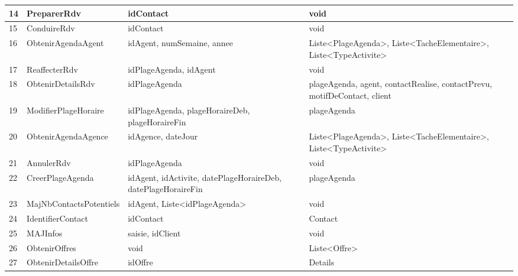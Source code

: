 \begin{table}[H]
{\begin{tabular}{p{1cm}|p{5cm}p{6cm}p{6cm}}
            14 & PreparerRdv                        & idContact                                                     & void\\ \hline
            15 & ConduireRdv                        & idContact                                                     & void\\ \hline
            16 & ObtenirAgendaAgent                 & idAgent, numSemaine, annee                                    & Liste<PlageAgenda>, Liste<TacheElementaire>, Liste<TypeActivite> \\ \hline
            17 & ReaffecterRdv                      & idPlageAgenda, idAgent                                        & void\\ \hline
            18 & ObtenirDetailsRdv                  & idPlageAgenda                                                 & plageAgenda, agent, contactRealise,  contactPrevu, motifDeContact, client\\ \hline
            19 & ModifierPlageHoraire               & idPlageAgenda, plageHoraireDeb, plageHoraireFin               & plageAgenda\\ \hline
            20 & ObtenirAgendaAgence                & idAgence, dateJour                                            & Liste<PlageAgenda>, Liste<TacheElementaire>,  Liste<TypeActivite>\\ \hline
            21 & AnnulerRdv                         & idPlageAgenda                                                 & void\\ \hline
            22 & CreerPlageAgenda                   & idAgent, idActivite, datePlageHoraireDeb, datePlageHoraireFin & plageAgenda\\ \hline
            23 & MajNbContactsPotentiels            & idAgent, Liste<idPlageAgenda>                                 & void\\ \hline
            24 & IdentifierContact                  & idContact                                                     & Contact\\ \hline
            25 & MAJInfos                           & saisie, idClient                                              & void\\ \hline
            26 & ObtenirOffres                      & void                                                          & Liste<Offre>\\ \hline
            27 & ObtenirDetailsOffre                & idOffre                                                       & Details\\ \hline

\end{tabular}}
\end{table}
